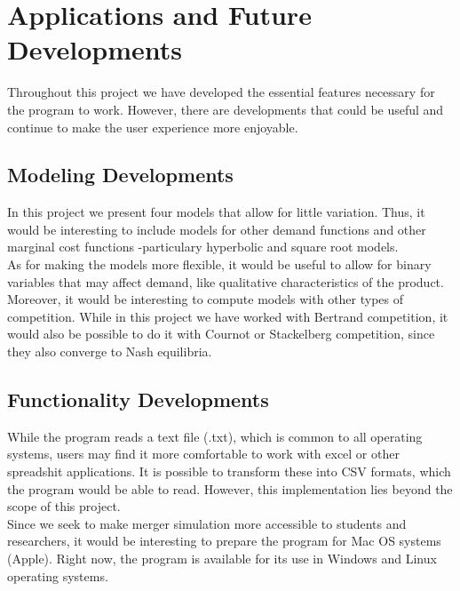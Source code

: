 \documentclass[12pt]{article}
\begin{document}
\section{Applications and Future Developments}
Throughout this project we have developed the essential features necessary for the program to work. However, there are developments that could be useful and continue to make the user experience more enjoyable.
\subsection{Modeling Developments}
In this project we present four models that allow for little variation. Thus, it would be interesting to include models for other demand functions and other marginal cost functions -particulary hyperbolic and square root models. \\
As for making the models more flexible, it would be useful to allow for binary variables that may affect demand, like qualitative characteristics of the product.\\ 
Moreover, it would be interesting to compute models with other types of competition. While in this project we have worked with Bertrand competition, it would also be possible to do it with Cournot or Stackelberg competition, since they also converge to Nash equilibria. 
\subsection{Functionality Developments}
While the program reads a text file (.txt), which is common to all operating systems, users may find it more comfortable to work with excel or other spreadshit applications. It is possible to transform these into CSV formats, which the program would be able to read. However, this implementation lies beyond the scope of this project.\\
Since we seek to make merger simulation more accessible to students and researchers, it would be interesting to prepare the program for Mac OS systems (Apple). Right now, the program is available for its use in Windows and Linux operating systems. 
\end{document}
